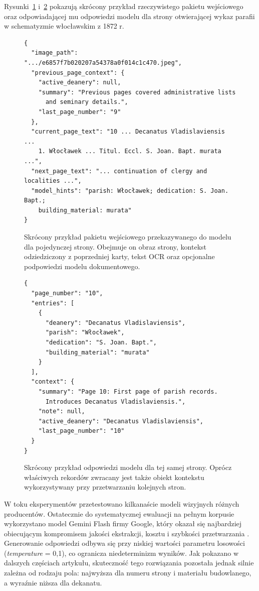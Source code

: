 Rysunki~\ref{fig:sample-llm-input} i~\ref{fig:sample-llm-output} pokazują skrócony przykład rzeczywistego pakietu wejściowego oraz odpowiadającej mu odpowiedzi modelu dla strony otwierającej wykaz parafii w schematyzmie włocławskim z 1872 r.

\begin{figure}[htbp]
\centering
\begin{minipage}{0.93\textwidth}
\begin{lstlisting}
{
  "image_path": ".../e6857f7b020207a54378a0f014c1c470.jpeg",
  "previous_page_context": {
    "active_deanery": null,
    "summary": "Previous pages covered administrative lists
      and seminary details.",
    "last_page_number": "9"
  },
  "current_page_text": "10 ... Decanatus Vladislaviensis ...
    1. Włocławek ... Titul. Eccl. S. Joan. Bapt. murata ...",
  "next_page_text": "... continuation of clergy and localities ...",
  "model_hints": "parish: Włocławek; dedication: S. Joan. Bapt.;
    building_material: murata"
}
\end{lstlisting}
\end{minipage}
\caption{Skrócony przykład pakietu wejściowego przekazywanego do modelu dla pojedynczej strony. Obejmuje on obraz strony, kontekst odziedziczony z poprzedniej karty, tekst OCR oraz opcjonalne podpowiedzi modelu dokumentowego.}
\label{fig:sample-llm-input}
\end{figure}

\begin{figure}[htbp]
\centering
\begin{minipage}{0.93\textwidth}
\begin{lstlisting}
{
  "page_number": "10",
  "entries": [
    {
      "deanery": "Decanatus Vladislaviensis",
      "parish": "Włocławek",
      "dedication": "S. Joan. Bapt.",
      "building_material": "murata"
    }
  ],
  "context": {
    "summary": "Page 10: First page of parish records.
      Introduces Decanatus Vladislaviensis.",
    "note": null,
    "active_deanery": "Decanatus Vladislaviensis",
    "last_page_number": "10"
  }
}
\end{lstlisting}
\end{minipage}
\caption{Skrócony przykład odpowiedzi modelu dla tej samej strony. Oprócz właściwych rekordów zwracany jest także obiekt kontekstu wykorzystywany przy przetwarzaniu kolejnych stron.}
\label{fig:sample-llm-output}
\end{figure}

W toku eksperymentów przetestowano kilkanaście modeli wizyjnych różnych producentów.
Ostatecznie do systematycznej ewaluacji na pełnym korpusie wykorzystano model Gemini Flash firmy Google, który okazał się najbardziej obiecującym kompromisem jakości ekstrakcji, kosztu i szybkości przetwarzania \parencite{google_gemini_models_2026}.
Generowanie odpowiedzi odbywa się przy niskiej wartości parametru losowości (\textit{temperature} = 0,1), co ogranicza niedeterminizm wyników.
Jak pokazano w dalszych częściach artykułu, skuteczność tego rozwiązania pozostała jednak silnie zależna od rodzaju pola: najwyższa dla numeru strony i materiału budowlanego, a wyraźnie niższa dla dekanatu.
